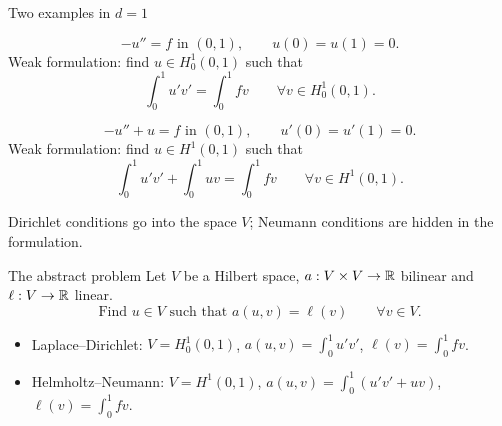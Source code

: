 \begin{frame}{Two examples in $d = 1$}
    \small
    \begin{example}
        \[
            -u'' = f \text{ in } (0,1), \qquad u(0) = u(1) = 0.
        \]
        Weak formulation: find $u \in H^1_0(0,1)$ such that
        \[
            \int_0^1 u' v' = \int_0^1 f v \qquad \forall v \in H^1_0(0,1).
        \]
    \end{example}
    \begin{example}
        \[
            -u'' + u = f \text{ in } (0,1), \qquad u'(0) = u'(1) = 0.
        \]
        Weak formulation: find $u \in H^1(0,1)$ such that
        \[
            \int_0^1 u' v' + \int_0^1 u v = \int_0^1 f v \qquad \forall v \in H^1(0,1).
        \]
    \end{example}
    {\small Dirichlet conditions go into the space $V$; Neumann conditions are hidden in the formulation.}
\end{frame}

\begin{frame}{The abstract problem}
    Let $V$ be a Hilbert space, $a : V \times V \to {\mathbb R}$ bilinear and $\ell : V \to {\mathbb R}$ linear.
    \[
        \tag{E}
        \text{Find } u \in V \text{ such that } a(u,v) = \ell(v) \qquad \forall v \in V.
    \]
    \begin{itemize}
        \item Laplace--Dirichlet: $V = H^1_0(0,1)$, $a(u,v) = \int_0^1 u'v'$, $\ell(v) = \int_0^1 fv$.
        \item Helmholtz--Neumann: $V = H^1(0,1)$, $a(u,v) = \int_0^1 (u'v' + uv)$, $\ell(v) = \int_0^1 fv$.
    \end{itemize}
\end{frame}

